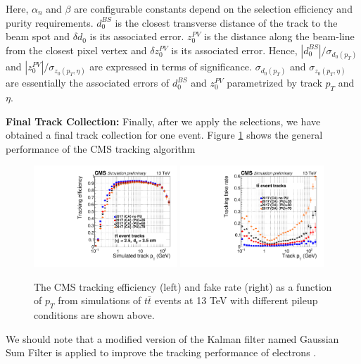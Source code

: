 Here, $\alpha_n$ and $\beta$ are configurable constants depend on the selection efficiency and purity requirements. $d_0^{BS}$ is the closest transverse distance of the track to the beam spot and $\delta d_0$ is its associated error. $z_0^{PV}$ is the distance along the beam-line from the closest pixel vertex and $\delta z_0^{PV}$ is its associated error. Hence, $|d_0^{BS}|/ \sigma_{d_0(p_T)}$ and $|z_0^{PV}|/ \sigma_{z_0(p_T,\eta)}$ are expressed in terms of significance. $\sigma_{d_0(p_T)}$ and $\sigma_{z_0(p_T,\eta)}$ are essentially the associated errors of $d_0^{BS}$ and $z_0^{PV}$ parametrized by track $p_T$ and $\eta$.


\textbf{Final Track Collection:}  Finally, after we apply the selections, we have obtained a final track collection for one event. Figure \ref{CMSTrackPer} shows the general performance of the CMS tracking algorithm

\begin{figure}[hbtp]
\begin{center}
\includegraphics[width=0.48\textwidth]{Figures/Chapter4/TrackPTEff.pdf}
\includegraphics[width=0.48\textwidth]{Figures/Chapter4/TrackPTFake.pdf}
\caption{The CMS tracking efficiency (left) and fake rate (right) as a function of $p_T$ from simulations of $t \bar t$ events at 13 TeV with different pileup conditions are shown above.}
\label{CMSTrackPer}
\end{center}
\end{figure} 

We should note that a modified version of the Kalman filter named Gaussian Sum Filter \cite{GSF} is applied to improve the tracking performance of electrons \cite{CMSTrackComp}.


